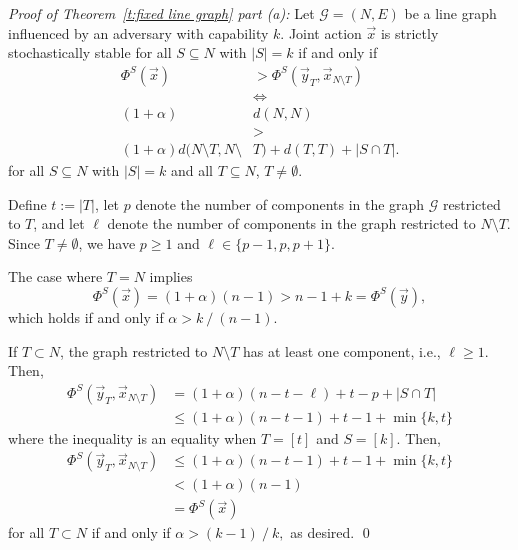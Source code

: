 \noindent\emph{Proof of Theorem~\ref{t:fixed line graph} part (a):}
Let $\mathcal{G} = (N,E)$ be a line graph influenced by an adversary with  capability $k$. Joint action $\vec{x}$ is strictly stochastically stable for all $S\subseteq N$ with $|S| = k$ if and only if
\begin{align}
\Phi^S(\vec{x}) &> \Phi^S(\vec{y}_T,\vec{x}_{N\setminus T})\nonumber\\
&\iff\nonumber\\ 
(1+\alpha) &d(N,N) \nonumber\\
&>\nonumber \\
(1+\alpha)d(N\setminus T,N\setminus &T) + d(T,T) + |S\cap T|. \label{e:lastineq}
\end{align}
for all $S\subseteq N$ with $|S| = k$ and all $T\subseteq N$, $T\neq \emptyset$.

Define $t:=|T|$, let $p$ denote the number of components in the graph $\mathcal{G}$ restricted to $T$, and let $\ell$ denote the number of components in the graph restricted to $N\setminus T$. Since $T\neq \emptyset$, we have $p\geq 1$ and $\ell \in \{p-1,p,p+1\}$. 

The case where $T = N$ implies 
\begin{equation*}
\Phi^S(\vec{x}) = (1+\alpha)(n-1) >n-1+k = \Phi^S(\vec{y}),
\end{equation*}
which holds if and only if 
$\alpha > {k\mathop{/}(n-1)}.$

If $T\subset N$, the graph restricted to $N\setminus T$ has at least one component, i.e., $\ell\geq 1$. Then,
\begin{align}
\Phi^S(\vec{y}_T,\vec{x}_{N\setminus T}) %
&= (1+\alpha)(n-t-\ell) + t-p + |S\cap T|\nonumber\\
&\leq (1+\alpha)(n-t-1) + t-1 + \min\{k,t\}\nonumber
\end{align}
where the inequality is an equality when $T = [t]$ and $S = [k].$ Then, 
\begin{align*}
\Phi^S(\vec{y}_T,\vec{x}_{N\setminus T})&\leq (1+\alpha)(n-t-1) + t-1 + \min\{k,t\} \\
&< (1+\alpha)(n-1) \\
&= \Phi^S(\vec{x})
\end{align*}
for all $T\subset N$ if and only if 
$\alpha >{(k-1)\mathop{/} k},$ as desired.
 \hfill\qed

